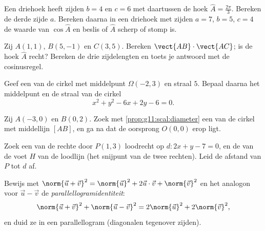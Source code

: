 \begin{exercise}[$\star\star$]\label{exo:g11:scal:5}
Een driehoek heeft zijden $b = 4$ en $c = 6$ met daartussen de hoek
$\widehat A = \frac{2\pi}{3}$. Bereken de derde zijde $a$. Bereken daarna in
een driehoek met zijden $a = 7$, $b = 5$, $c = 4$ de waarde van
$\cos\widehat A$ en beslis of $\widehat A$ scherp of stomp is.
\end{exercise}

\begin{exercise}[$\star\star$]\label{exo:g11:scal:6}
Zij $A(1, 1)$, $B(5, -1)$ en $C(3, 5)$. Bereken
$\vect{AB} \cdot \vect{AC}$; is de hoek $\widehat A$ recht? Bereken de drie
zijdelengten en toets je antwoord met de cosinusregel.
\end{exercise}

\begin{exercise}[$\star\star$]\label{exo:g11:scal:7}
Geef een  van de cirkel met middelpunt $\Omega(-2, 3)$ en straal
$5$. Bepaal daarna het middelpunt en de straal van de cirkel
\[
x^2 + y^2 - 6x + 2y - 6 = 0 .
\]
\end{exercise}

\begin{exercise}[$\star\star$]\label{exo:g11:scal:8}
Zij $A(-3, 0)$ en $B(0, 2)$. Zoek met \cref{prop:g11:scal:diameter} een
 van de cirkel met middellijn $[AB]$, en ga na dat de oorsprong
$O(0,0)$ erop ligt.
\end{exercise}

\begin{exercise}[$\star\star$]\label{exo:g11:scal:9}
Zoek een  van de rechte door $P(1, 3)$ loodrecht op
$d : 2x + y - 7 = 0$, en de  van de voet $H$ van de loodlijn (het
snijpunt van de twee rechten). Leid de afstand van $P$ tot $d$ af.
\end{exercise}

\begin{exercise}[$\star\star$]\label{exo:g11:scal:10}
Bewijs met $\norm{\vec u + \vec v}^2 = \norm{\vec u}^2 + 2\vec u\cdot\vec v +
\norm{\vec v}^2$ en het analogon voor $\vec u - \vec v$ de
\emph{parallellogramidentiteit}:
\[
\norm{\vec u + \vec v}^2 + \norm{\vec u - \vec v}^2
= 2\norm{\vec u}^2 + 2\norm{\vec v}^2 ,
\]
en duid ze in een parallellogram (diagonalen tegenover zijden).
\end{exercise}

